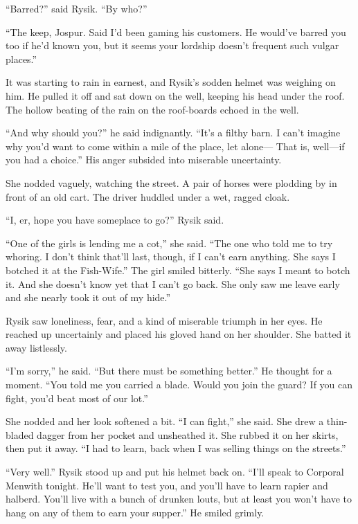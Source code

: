 \documentclass[10pt,b5paper]{article}
\begin{document}
``Barred?'' said Rysik. ``By who?''

``The keep, Jospur. Said I'd been gaming his customers. He would've
barred you too if he'd known you, but it seems your lordship doesn't
frequent such vulgar places.''

It was starting to rain in earnest, and Rysik's sodden helmet
was weighing on him. He pulled it off and sat down on the well,
keeping his head under the roof. The hollow beating of the rain on
the roof-boards echoed in the well.

``And why should you?'' he said indignantly. ``It's a filthy barn. I
can't imagine why you'd want to come within a mile of the place,
let alone--- That is, well---if you had a choice.'' His anger subsided
into miserable uncertainty.

She nodded vaguely, watching the street. A pair of horses were
plodding by in front of an old cart. The driver huddled under a wet,
ragged cloak.

``I, er, hope you have someplace to go?'' Rysik said.

``One of the girls is lending me a cot,'' she said. ``The one who
told me to try whoring. I don't think that'll last, though, if
I can't earn anything. She says I botched it at the Fish-Wife.''
The girl smiled bitterly. ``She says I meant to botch it. And she
doesn't know yet that I can't go back. She only saw me leave early
and she nearly took it out of my hide.''

Rysik saw loneliness, fear, and a kind of miserable triumph in her
eyes. He reached up uncertainly and placed his gloved hand on her
shoulder. She batted it away listlessly.

``I'm sorry,'' he said. ``But there must be something better.'' He
thought for a moment. ``You told me you carried a blade. Would you
join the guard? If you can fight, you'd beat most of our lot.''

She nodded and her look softened a bit. ``I can fight,'' she said.
She drew a thin-bladed dagger from her pocket and unsheathed it.
She rubbed it on her skirts, then put it away. ``I had to learn,
back when I was selling things on the streets.''

``Very well.'' Rysik stood up and put his helmet back on. ``I'll speak
to Corporal Menwith tonight. He'll want to test you, and you'll have
to learn rapier and halberd. You'll live with a bunch of drunken
louts, but at least you won't have to hang on any of them to earn
your supper.'' He smiled grimly.
\end{document}
